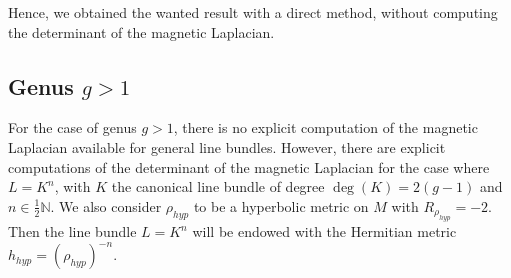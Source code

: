 \documentclass{article}
\theoremstyle{definition}
\theoremstyle{remark}
\begin{document}
Hence, we obtained the wanted result with a direct method, without computing the determinant of the magnetic Laplacian.
\subsection{Genus $g>1$}
For the case of genus $g>1$, there is no explicit computation of the magnetic Laplacian available for general line bundles. However, there are explicit computations of the determinant of the magnetic Laplacian for the case where $L=K^{n}$, with $K$ the canonical line bundle of degree $\deg(K)=2(g-1)$ and $n \in \frac{1}{2}\mathbb{N}.$ We also consider $\rho_{hyp}$ to be a hyperbolic metric on $M$ with $R_{\rho_{hyp}}=-2.$ Then the line bundle $L=K^{n}$ will be endowed with the Hermitian metric $h_{hyp}=(\rho_{hyp})^{-n}.$
\end{document}
